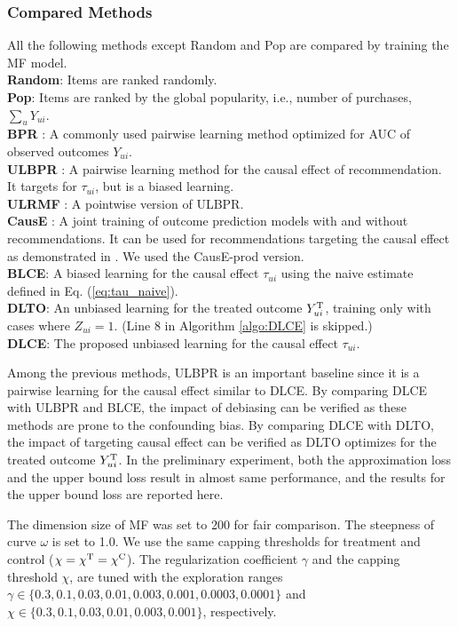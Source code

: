 \documentclass[manuscript,screen]{acmart}
\begin{document}
\subsubsection{Compared Methods}
\label{subsubsec:compared_methods}
All the following methods except Random and Pop are compared by training the MF model.\\
\textbf{Random}: Items are ranked randomly.\\
\textbf{Pop}: Items are ranked by the global popularity, i.e., number of purchases, $\sum_u Y_{ui}$.\\
\textbf{BPR} \cite{Rendle09} : A commonly used pairwise learning method optimized for AUC of observed outcomes $Y_{ui}$. \\
\textbf{ULBPR} \cite{Sato19}: A pairwise learning method for the causal effect of recommendation. It targets for $\tau_{ui}$, but is a biased learning. \\
\textbf{ULRMF} \cite{Sato19}: A pointwise version of ULBPR.\\ 
\textbf{CausE} \cite{Bonner18}: A joint training of outcome prediction models with and without recommendations. It can be used for recommendations targeting the causal effect as demonstrated in \cite{Sato19}. We used the CausE-prod version.\\
\textbf{BLCE}: A biased learning for the causal effect $\tau_{ui}$ using the naive estimate defined in Eq. (\ref{eq:tau_naive}).\\
\textbf{DLTO}: An unbiased learning for the treated outcome $Y_{ui}^\textnormal{T}$, training only with cases where $Z_{ui}=1$.
(Line 8 in Algorithm \ref{algo:DLCE} is skipped.)\\
\textbf{DLCE}: The proposed unbiased learning for the causal effect $\tau_{ui}$.

Among the previous methods, ULBPR is an important baseline since it is a pairwise learning for the causal effect similar to DLCE. %
By comparing DLCE with ULBPR and BLCE, the impact of debiasing can be verified as these methods are prone to the confounding bias.
By comparing DLCE with DLTO, the impact of targeting causal effect can be verified as DLTO optimizes for the treated outcome $Y_{ui}^\textnormal{T}$.
In the preliminary experiment, both the approximation loss and the upper bound loss result in almost same performance, and the results for the upper bound loss are reported here.

The dimension size of MF was set to 200 for fair comparison.
The steepness of curve $\omega$ is set to 1.0.
We use the same capping thresholds for treatment and control ($\chi = \chi^\textnormal{T} = \chi^\textnormal{C}$).
The regularization coefficient $\gamma$ and the capping threshold $\chi$, are tuned with the exploration ranges $\gamma \in \{0.3, 0.1, 0.03, 0.01, 0.003, 0.001, 0.0003, 0.0001\}$ and $\chi \in \{0.3, 0.1, 0.03, 0.01, 0.003, 0.001\}$, respectively.
\end{document}
